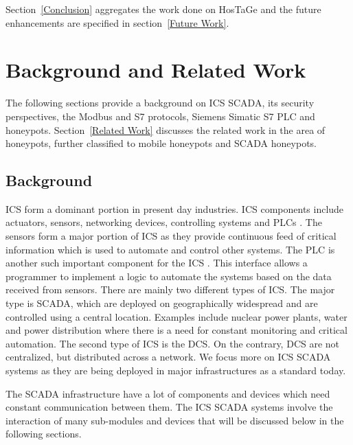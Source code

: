 \documentclass[article,msc=informatik,type=msc,colorback,accentcolor=tud9c]{tudthesis}
\begin{document}
   
   \vspace{3mm}
    Section~\ref{Conclusion} aggregates the work done on HosTaGe and the future enhancements are specified in section~\ref{Future Work}.
     
     
     
   
   \newpage  
   \section{Background and Related Work}\label{Background and Related Work}
   
   The following sections provide a background on \ac{ICS} \ac{SCADA}, its security perspectives, the Modbus and S7  protocols, Siemens Simatic S7 \ac{PLC}  and honeypots. Section~\ref{Related Work} discusses the related work in the area of honeypots, further classified to mobile honeypots and SCADA honeypots. 
   
   \subsection{Background } \label{Background}
    
   \ac{ICS} form a dominant portion in present day industries.  \ac{ICS} components include actuators, sensors, networking devices, controlling systems and \ac{PLC}s . The sensors form a major portion of \ac{ICS} as they provide continuous feed of critical information which is used to automate and control other systems. The \ac{PLC} is another such important component for the \ac{ICS} . This interface allows a programmer to implement a logic to automate the systems based on the data received from sensors. There are mainly two different types of \ac{ICS}. The major type is \ac{SCADA}, which are deployed on geographically widespread and are controlled using a central location. Examples include nuclear power plants, water and power distribution where there is a need for constant monitoring and critical automation.  The second type of \ac{ICS} is the \ac{DCS}. On the contrary, \ac{DCS} are not centralized, but distributed across a network. We focus more on \ac{ICS} \ac{SCADA} systems as they are being deployed in major infrastructures as a standard today.
    
   The \ac{SCADA} infrastructure have a lot of components and devices which need constant communication between them. The \ac{ICS} \ac{SCADA} systems involve the interaction of many sub-modules and devices that will be discussed below in the following sections.
\end{document}
